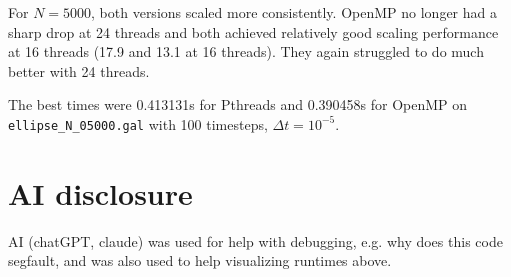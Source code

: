 \documentclass[11pt,a4paper]{article}
\begin{document}
For $N = 5000$, both versions scaled more consistently. OpenMP no longer had a sharp drop
at 24 threads and both achieved relatively good scaling performance at 16 threads (17.9 and
13.1 at 16 threads). They again struggled to do much better with 24 threads.

The best times were 0.413131s for Pthreads and 0.390458s for OpenMP on \texttt{ellipse\_N\_05000.gal}
with 100 timesteps, $\Delta t = 10^{-5}$.

\section{AI disclosure}
AI (chatGPT, claude) was used for help with debugging, e.g. why does this code segfault, and
was also used to help visualizing runtimes above.
\end{document}
